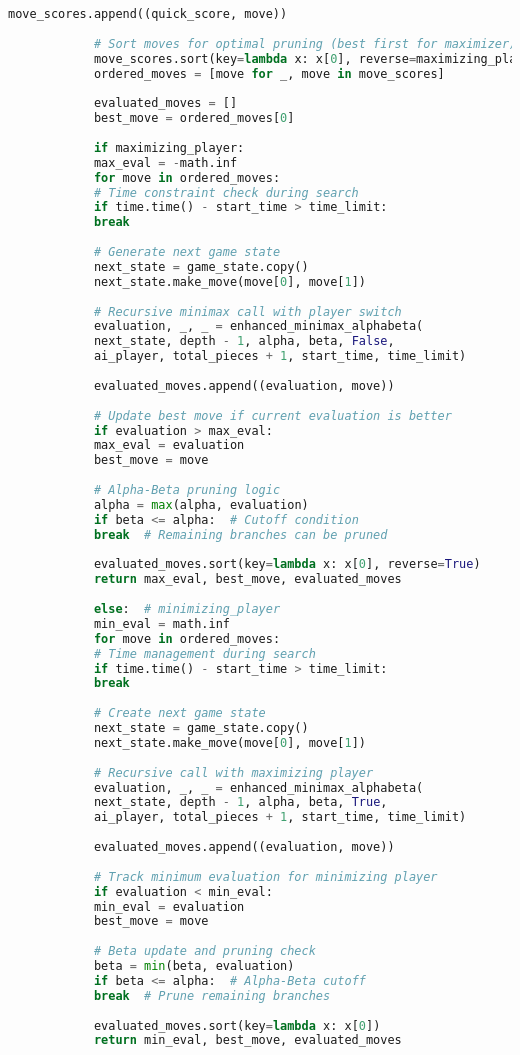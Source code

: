 \documentclass[12pt]{article}
\newenvironment{ltrcode}{\lr\bgroup}{\egroup}
\begin{document}
\begin{ltrcode}
\begin{lstlisting}[language=Python, caption=Complete Enhanced Minimax with Alpha-Beta Pruning]
			move_scores.append((quick_score, move))
			
			# Sort moves for optimal pruning (best first for maximizer)
			move_scores.sort(key=lambda x: x[0], reverse=maximizing_player)
			ordered_moves = [move for _, move in move_scores]
			
			evaluated_moves = []
			best_move = ordered_moves[0]
			
			if maximizing_player:
			max_eval = -math.inf
			for move in ordered_moves:
			# Time constraint check during search
			if time.time() - start_time > time_limit:
			break
			
			# Generate next game state
			next_state = game_state.copy()
			next_state.make_move(move[0], move[1])
			
			# Recursive minimax call with player switch
			evaluation, _, _ = enhanced_minimax_alphabeta(
			next_state, depth - 1, alpha, beta, False, 
			ai_player, total_pieces + 1, start_time, time_limit)
			
			evaluated_moves.append((evaluation, move))
			
			# Update best move if current evaluation is better
			if evaluation > max_eval:
			max_eval = evaluation
			best_move = move
			
			# Alpha-Beta pruning logic
			alpha = max(alpha, evaluation)
			if beta <= alpha:  # Cutoff condition
			break  # Remaining branches can be pruned
			
			evaluated_moves.sort(key=lambda x: x[0], reverse=True)
			return max_eval, best_move, evaluated_moves
			
			else:  # minimizing_player
			min_eval = math.inf
			for move in ordered_moves:
			# Time management during search
			if time.time() - start_time > time_limit:
			break
			
			# Create next game state
			next_state = game_state.copy()
			next_state.make_move(move[0], move[1])
			
			# Recursive call with maximizing player
			evaluation, _, _ = enhanced_minimax_alphabeta(
			next_state, depth - 1, alpha, beta, True, 
			ai_player, total_pieces + 1, start_time, time_limit)
			
			evaluated_moves.append((evaluation, move))
			
			# Track minimum evaluation for minimizing player
			if evaluation < min_eval:
			min_eval = evaluation
			best_move = move
			
			# Beta update and pruning check
			beta = min(beta, evaluation)
			if beta <= alpha:  # Alpha-Beta cutoff
			break  # Prune remaining branches
			
			evaluated_moves.sort(key=lambda x: x[0])
			return min_eval, best_move, evaluated_moves
		\end{lstlisting}
	\end{ltrcode}
	
\end{document}
